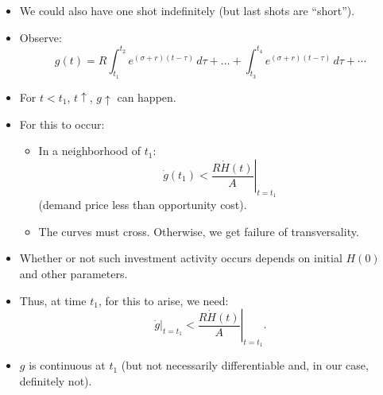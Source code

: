 \documentclass[12pt,compress,handout]{beamer}  %
\begin{document}
\begin{frame}
\begin{itemize}[<+->]
\item We could also have one shot indefinitely (but last shots are
    ``short'').

\item Observe:
  \begin{equation*}
    g(t) = R \int_{t_{1}}^{t_{2}} e^{(\sigma +r)(t-\tau)}\,d\tau
    + \dots + \int_{t_{3}}^{t_{4}} e^{(\sigma +r)(t-\tau)}\,d\tau
    + \cdots
  \end{equation*}
\end{itemize}

\end{frame}


\begin{frame}
\begin{itemize}[<+->]
\item For $t<t_{1}$, $t\uparrow$, $g\uparrow$ can happen.

\item For this to occur:
  \begin{itemize}[<+->]
    \item In a neighborhood of $t_{1}$:
    \begin{equation*}
      \dot{g}(t_{1}) < \left. \frac{R\dot{H}(t)}{A} \right|_{t=t_{1}}
    \end{equation*}
    (demand price less than opportunity cost).

    \item The curves must cross. Otherwise, we get failure of
        transversality.
    \end{itemize}
\end{itemize}
\end{frame}


\begin{frame}
\begin{itemize}[<+->]
\item Whether or not such investment activity occurs depends on initial
    $H(0)$ and other parameters.

\item Thus, at time $t_{1}$, for this to arise, we need:
  \begin{equation*}
    \dot{g}\bigg|_{t=t_{1}} < \left. \frac{R\dot{H}(t)}{A}
    \right|_{t=t_{1}}.
  \end{equation*}

\item $g$ is continuous at $t_{1}$ (but not necessarily differentiable and,
    in our case, definitely not).
\end{itemize}
\end{frame}
\end{document}
